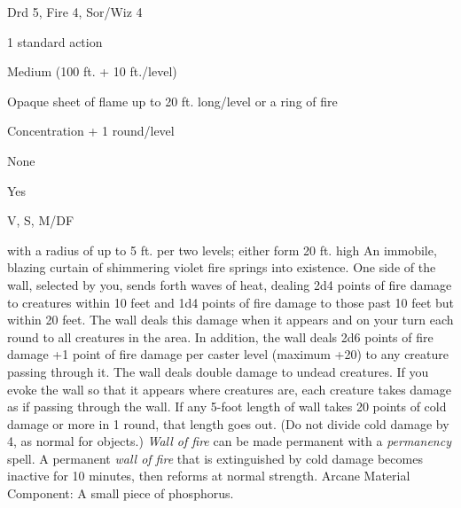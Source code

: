 
\begin{description*}
\item[Level:] Drd 5, Fire 4, Sor/Wiz 4
\item[Casting Time:] 1 standard action
\item[Range:] Medium (100 ft. + 10 ft./level)
\item[Effect:] Opaque sheet of flame up to 20 ft. long/level or a ring of fire
\item[Duration:] Concentration + 1 round/level
\item[Saving Throw:] None
\item[Spell Resistance:] Yes
\item[Components:] V, S, M/DF
\end{description*}

with a radius of up to 5 ft. per two levels; either form 20 ft. high
An immobile, blazing curtain of shimmering violet fire springs into existence.
One side of the wall, selected by you, sends forth waves of heat, dealing 2d4 points
of fire damage to creatures within 10 feet and 1d4 points of fire damage to those
past 10 feet but within 20 feet. The wall deals this damage when it appears and
on your turn each round to all creatures in the area. In addition, the wall deals
2d6 points of fire damage +1 point of fire damage per caster level (maximum +20)
to any creature passing through it. The wall deals double damage to undead creatures.
If you evoke the wall so that it appears where creatures are, each creature takes
damage as if passing through the wall. If any 5-foot length of wall takes 20 points
of cold damage or more in 1 round, that length goes out. (Do not divide cold damage
by 4, as normal for objects.)
\textit{Wall of fire} can be made permanent with a \textit{permanency} spell. A
permanent \textit{wall of fire} that is extinguished by cold damage becomes inactive
for 10 minutes, then reforms at normal strength.
Arcane Material Component: A small piece of phosphorus.